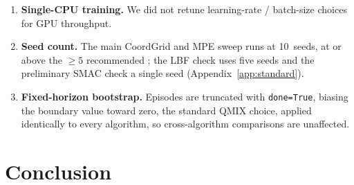 \documentclass[10pt]{article}
\newcommand{\PEseeds}{10}             %
\begin{document}
\begin{enumerate}[leftmargin=*,itemsep=0pt,topsep=2pt]
        was run at a single (150k) budget, so we cannot rule out that either
        mechanism routes with more training; and it is one constructed relay
        task. Whether message passing separates from payoff propagation on
        genuine multi-hop routing, and at what budget, remains open.
  \item \textbf{Single-CPU training.} We did not retune learning-rate /
        batch-size choices for GPU throughput.
  \item \textbf{Seed count.} The main CoordGrid and MPE sweep runs at
        \PEseeds\ seeds, at or above the $\ge 5$ recommended
        \citep{henderson_2018_drlmatters,agarwal_2021_precipice}; the LBF
        check uses five seeds and the preliminary SMAC check a single seed
        (Appendix~\ref{app:standard}).
  \item \textbf{Fixed-horizon bootstrap.} Episodes are truncated with
        \texttt{done=True}, biasing the boundary value toward zero, the
        standard QMIX choice, applied identically to every algorithm, so
        cross-algorithm comparisons are unaffected.
\end{enumerate}

\section{Conclusion}
\label{sec:conclusion}
\end{document}
